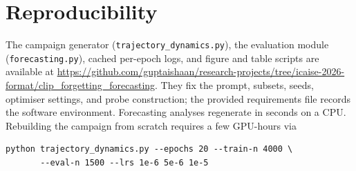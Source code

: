 \documentclass[manuscript,nonacm]{acmart}
\begin{document}
\section*{Reproducibility}
The campaign generator (\texttt{trajectory\_dynamics.py}), the evaluation module
(\texttt{forecasting.py}), cached per-epoch logs, and figure and table scripts are
available at \url{https://github.com/guptaishaan/research-projects/tree/icaise-2026-format/clip_forgetting_forecasting}.
They fix the prompt, subsets, seeds, optimiser settings, and probe construction; the
provided requirements file records the software environment. Forecasting analyses
regenerate in seconds on a CPU.
Rebuilding the campaign from scratch requires a few GPU-hours via
\begin{verbatim}
python trajectory_dynamics.py --epochs 20 --train-n 4000 \
       --eval-n 1500 --lrs 1e-6 5e-6 1e-5
\end{verbatim}



\end{document}
